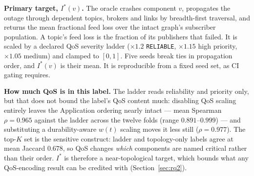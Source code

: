 \documentclass[preprint,3p]{elsarticle}
\begin{document}
\begin{table}[htbp]
\centering
\footnotesize
\caption{Simulation oracles, operational constructs, and evaluation roles.}
\label{tab:oracle_roles}
\end{table}

\noindent\textbf{Primary target, $I^*(v)$.} The oracle crashes component $v$, propagates the outage through dependent topics, brokers and links by breadth-first traversal, and returns the mean fractional feed loss over the intact graph's subscriber population. A topic's feed loss is the fraction of its publishers that failed. It is scaled by a declared QoS severity ladder ($\times 1.2$ \texttt{RELIABLE}, $\times 1.15$ high priority, $\times 1.05$ medium) and clamped to $[0, 1]$. Five seeds break ties in propagation order, and $I^*(v)$ is their mean. It is reproducible from a fixed seed set, as CI gating requires.

\noindent\textbf{How much QoS is in this label.} The ladder reads reliability and priority only, but that does not bound the label's QoS content much: disabling QoS scaling entirely leaves the Application ordering nearly intact --- mean Spearman $\rho = 0.965$ against the ladder across the twelve folds (range $0.891$--$0.999$) --- and substituting a durability-aware $w(t)$ scaling moves it less still ($\rho = 0.977$). The top-$K$ set is the sensitive construct: ladder and topology-only labels agree at mean Jaccard $0.678$, so QoS changes \emph{which} components are named critical rather than their order. $I^*$ is therefore a near-topological target, which bounds what any QoS-encoding result can be credited with (Section~\ref{sec:rq2}).
\end{document}
